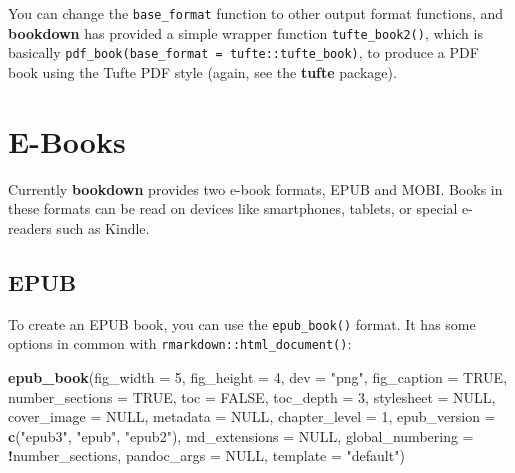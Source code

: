 \documentclass[
  12pt,
]{krantz}
\newenvironment{Shaded}{\begin{snugshade}}{\end{snugshade}}
\newcommand{\AttributeTok}[1]{\textcolor[rgb]{0.13,0.29,0.53}{#1}}
\newcommand{\ConstantTok}[1]{\textcolor[rgb]{0.56,0.35,0.01}{#1}}
\newcommand{\DecValTok}[1]{\textcolor[rgb]{0.00,0.00,0.81}{#1}}
\newcommand{\FunctionTok}[1]{\textcolor[rgb]{0.13,0.29,0.53}{\textbf{#1}}}
\newcommand{\NormalTok}[1]{#1}
\newcommand{\SpecialCharTok}[1]{\textcolor[rgb]{0.81,0.36,0.00}{\textbf{#1}}}
\newcommand{\StringTok}[1]{\textcolor[rgb]{0.31,0.60,0.02}{#1}}
\theoremstyle{definition}
\theoremstyle{definition}
\theoremstyle{definition}
\theoremstyle{definition}
\theoremstyle{remark}
\begin{document}
You can change the \texttt{base\_format} function to other output format functions, and \textbf{bookdown} has provided a simple wrapper function \texttt{tufte\_book2()}, which is basically \texttt{pdf\_book(base\_format\ =\ tufte::tufte\_book)}, to produce a PDF book using the Tufte PDF style (again, see the \textbf{tufte} package).

\section{E-Books}\label{e-books}

Currently \textbf{bookdown} provides two e-book formats, EPUB and MOBI. Books in these formats can be read on devices like smartphones, tablets, or special e-readers such as Kindle.

\subsection{EPUB}\label{epub}

To create an EPUB book, you can use the \texttt{epub\_book()} format. It has some options in common with \texttt{rmarkdown::html\_document()}:

\begin{Shaded}
\begin{Highlighting}[]
\FunctionTok{epub\_book}\NormalTok{(}\AttributeTok{fig\_width =} \DecValTok{5}\NormalTok{, }\AttributeTok{fig\_height =} \DecValTok{4}\NormalTok{, }\AttributeTok{dev =} \StringTok{"png"}\NormalTok{,}
  \AttributeTok{fig\_caption =} \ConstantTok{TRUE}\NormalTok{, }\AttributeTok{number\_sections =} \ConstantTok{TRUE}\NormalTok{, }\AttributeTok{toc =} \ConstantTok{FALSE}\NormalTok{,}
  \AttributeTok{toc\_depth =} \DecValTok{3}\NormalTok{, }\AttributeTok{stylesheet =} \ConstantTok{NULL}\NormalTok{, }\AttributeTok{cover\_image =} \ConstantTok{NULL}\NormalTok{,}
  \AttributeTok{metadata =} \ConstantTok{NULL}\NormalTok{, }\AttributeTok{chapter\_level =} \DecValTok{1}\NormalTok{, }\AttributeTok{epub\_version =} \FunctionTok{c}\NormalTok{(}\StringTok{"epub3"}\NormalTok{,}
    \StringTok{"epub"}\NormalTok{, }\StringTok{"epub2"}\NormalTok{), }\AttributeTok{md\_extensions =} \ConstantTok{NULL}\NormalTok{, }\AttributeTok{global\_numbering =} \SpecialCharTok{!}\NormalTok{number\_sections,}
  \AttributeTok{pandoc\_args =} \ConstantTok{NULL}\NormalTok{, }\AttributeTok{template =} \StringTok{"default"}\NormalTok{)}
\end{Highlighting}
\end{Shaded}
\end{document}
